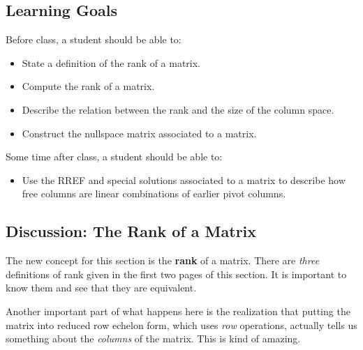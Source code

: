 \documentclass[10pt,]{book}
\newcommand{\terminology}[1]{\textbf{#1}}
\theoremstyle{plain}
\numberwithin{equation}{section}
\begin{document}
\subsection[Learning Goals]{Learning Goals}\label{subsection-69}
Before class, a student should be able to:%
\begin{itemize}
\item{}State a definition of the rank of a matrix.\item{}Compute the rank of a matrix.\item{}Describe the relation between the rank and the size of the column
        space.
      \item{}Construct the nullspace matrix associated to a matrix.\end{itemize}
\par
Some time after class, a student should be able to:%
\begin{itemize}
\item{}Use the RREF and special solutions associated to a matrix to describe
        how free columns are linear combinations of earlier pivot columns.
      \end{itemize}
\typeout{************************************************}
\typeout{************************************************}
\subsection[Discussion: The Rank of a Matrix]{Discussion: The Rank of a Matrix}\label{subsection-70}

      The new concept for this section is the \terminology{rank} of a matrix.
      There are \emph{three} definitions of rank given in the first two
      pages of this section. It is important to know them and see that they
      are equivalent.
\par

      Another important part of what happens here is the realization that
      putting the matrix into reduced row echelon form, which uses \emph{row}
      operations, actually tells us something about the \emph{columns} of the
      matrix. This is kind of amazing.
\par
\end{document}
